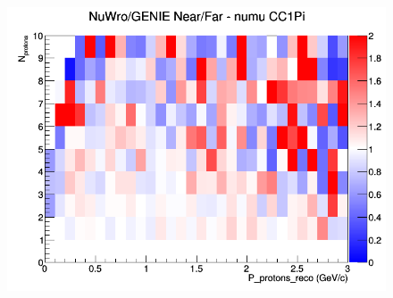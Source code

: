 \begin{figure}[h]
\endminipage
{}
\includegraphics[width=\linewidth]{eff_N_P/LAr/protons/ratios/CC1Pi_NuWro_GENIE_numu_NF_N_P.png}
\endminipage
\newline
\end{figure}
\clearpage
